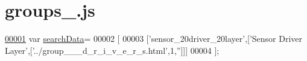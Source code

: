 \hypertarget{groups__1_8js_source}{}\section{groups\+\_.\+js}
\label{groups__1_8js_source}

\begin{DoxyCode}
\hypertarget{groups__1_8js_source.tex_l00001}{}\hyperlink{groups__1_8js_ad01a7523f103d6242ef9b0451861231e}{00001} var \hyperlink{groups__1_8js_ad01a7523f103d6242ef9b0451861231e}{searchData}=
00002 [
00003   [\textcolor{stringliteral}{'sensor\_20driver\_20layer'},[\textcolor{stringliteral}{'Sensor Driver Layer'},[\textcolor{stringliteral}{'../group\_\_\_d\_r\_i\_v\_e\_r\_s.html'},1,\textcolor{stringliteral}{''}]]]
00004 ];
\end{DoxyCode}
